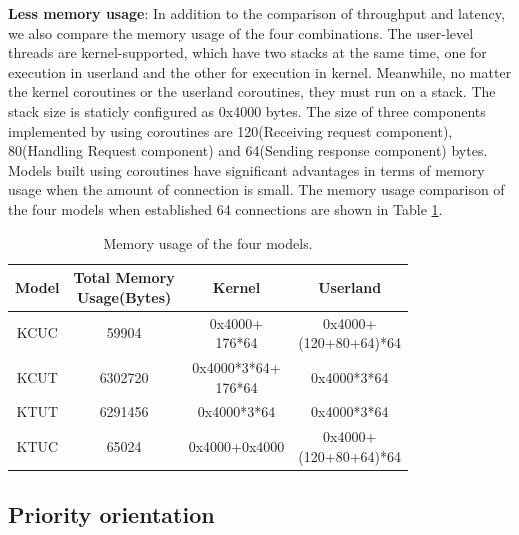 \documentclass[sigconf,review,anonymous]{acmart}
\begin{document}
\textbf{Less memory usage}: In addition to the comparison of throughput and latency, we also compare the memory usage of the four combinations. The user-level threads are kernel-supported, which have two stacks at the same time, one for execution in userland and the other for execution in kernel. Meanwhile, no matter the kernel coroutines or the userland coroutines, they must run on a stack. The stack size is staticly configured as 0x4000 bytes. The size of three components implemented by using coroutines are 120(Receiving request component), 80(Handling Request component) and 64(Sending response component) bytes. Models built using coroutines have significant advantages in terms of memory usage when the amount of connection is small. The memory usage comparison of the four models when established 64 connections are shown in Table \ref{tab:mem_usage}.

\begin{table}[htbp]
	\centering
	\caption{Memory usage of the four models.}
	\label{tab:mem_usage}
	\begin{tabular}{@{}cccc@{}}
		\toprule
		Model & \makecell{Total Memory \\ Usage(Bytes)} & Kernel                  & Userland                      \\ \midrule
		KCUC  & 59904   & \makecell{0x4000+\\176*64}       & \makecell{0x4000+\\(120+80+64)*64} \\
		KCUT  & 6302720 & \makecell{0x4000*3*64+\\176*64} & 0x4000*3*64               \\
		KTUT  & 6291456 & 0x4000*3*64         & 0x4000*3*64               \\
		KTUC  & 65024   & 0x4000+0x4000         & \makecell{0x4000+\\(120+80+64)*64} \\ \bottomrule
	\end{tabular}
	\vspace{-1.0em}
\end{table}

\subsection{Priority orientation}
\end{document}
